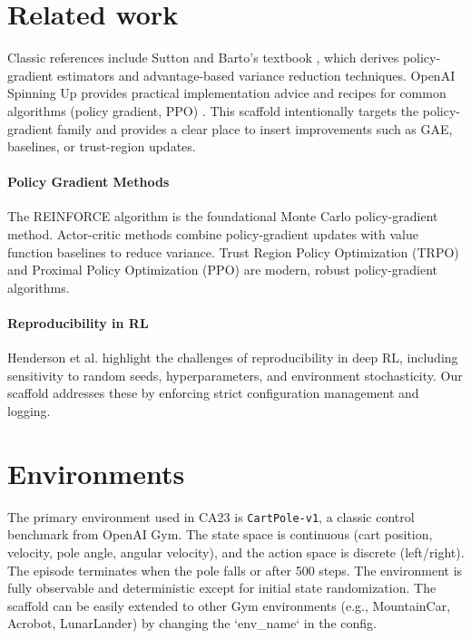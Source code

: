 \documentclass[11pt]{article}
\begin{document}
\section{Related work}
Classic references include Sutton and Barto's textbook \cite{sutton_barto},
which derives policy-gradient estimators and advantage-based variance
reduction techniques. OpenAI Spinning Up provides practical implementation
advice and recipes for common algorithms (policy gradient, PPO) \cite{spinup}.
This scaffold intentionally targets the policy-gradient family and provides a
clear place to insert improvements such as GAE, baselines, or trust-region
updates.

\paragraph{Policy Gradient Methods} The REINFORCE algorithm \cite{williams1992simple} is the foundational Monte Carlo policy-gradient method. Actor-critic methods \cite{konda2000actor} combine policy-gradient updates with value function baselines to reduce variance. Trust Region Policy Optimization (TRPO) \cite{schulman2015trust} and Proximal Policy Optimization (PPO) \cite{schulman2017proximal} are modern, robust policy-gradient algorithms.

\paragraph{Reproducibility in RL} Henderson et al. \cite{henderson2018deep} highlight the challenges of reproducibility in deep RL, including sensitivity to random seeds, hyperparameters, and environment stochasticity. Our scaffold addresses these by enforcing strict configuration management and logging.

\section{Environments}
The primary environment used in CA23 is \texttt{CartPole-v1}, a classic control benchmark from OpenAI Gym. The state space is continuous (cart position, velocity, pole angle, angular velocity), and the action space is discrete (left/right). The episode terminates when the pole falls or after 500 steps. The environment is fully observable and deterministic except for initial state randomization. The scaffold can be easily extended to other Gym environments (e.g., MountainCar, Acrobot, LunarLander) by changing the `env_name` in the config.
\end{document}
